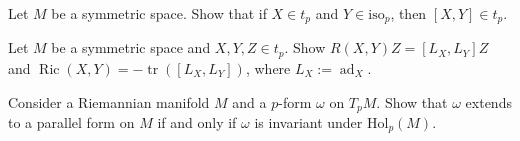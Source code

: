 \begin{remark}
  \label{rem:pet-ch10-exercise-bracket-tp-isop}
  Let $M$ be a symmetric space. Show that if $X\in t_p$ and $Y\in\mathrm{iso}_p$,
  then $[X,Y]\in t_p$.
\end{remark}

\begin{remark}
  \label{rem:pet-ch10-exercise-curvature-ricci-bracket-formula}
  Let $M$ be a symmetric space and $X,Y,Z\in t_p$. Show
  $R(X,Y)Z=[L_X,L_Y]Z$ and $\operatorname{Ric}(X,Y)=-\operatorname{tr}([L_X,L_Y])$, where
  $L_X:=\operatorname{ad}_X$.
\end{remark}

\begin{remark}
  \label{rem:pet-ch10-exercise-parallel-form-holonomy-invariant}
  Consider a Riemannian manifold $M$ and a $p$-form $\omega$ on $T_pM$. Show
  that $\omega$ extends to a parallel form on $M$ if and only if $\omega$ is
  invariant under $\mathrm{Hol}_p(M)$.
\end{remark}
